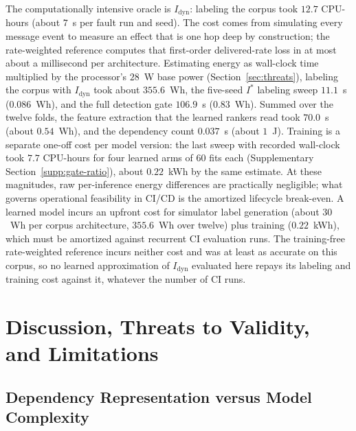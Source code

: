 \documentclass[preprint,3p]{elsarticle}
\begin{document}
The computationally intensive oracle is $I_{\text{dyn}}$: labeling the corpus took $12.7$ CPU-hours (about $7$~s per fault run and seed). The cost comes from simulating every message event to measure an effect that is one hop deep by construction; the rate-weighted reference computes that first-order delivered-rate loss in at most about a millisecond per architecture. Estimating energy as wall-clock time multiplied by the processor's $28$~W base power (Section~\ref{sec:threats}), labeling the corpus with $I_{\text{dyn}}$ took about $355.6$~Wh, the five-seed $I^*$ labeling sweep $11.1$~s ($0.086$~Wh), and the full detection gate $106.9$~s ($0.83$~Wh). Summed over the twelve folds, the feature extraction that the learned rankers read took $70.0$~s (about $0.54$~Wh), and the dependency count $0.037$~s (about $1$~J). Training is a separate one-off cost per model version: the last sweep with recorded wall-clock took $7.7$ CPU-hours for four learned arms of 60 fits each (Supplementary Section~\ref{supp:gate-ratio}), about $0.22$~kWh by the same estimate. At these magnitudes, raw per-inference energy differences are practically negligible; what governs operational feasibility in CI/CD is the amortized lifecycle break-even. A learned model incurs an upfront cost for simulator label generation (about $30$~Wh per corpus architecture, $355.6$~Wh over twelve) plus training ($0.22$~kWh), which must be amortized against recurrent CI evaluation runs. The training-free rate-weighted reference incurs neither cost and was at least as accurate on this corpus, so no learned approximation of $I_{\text{dyn}}$ evaluated here repays its labeling and training cost against it, whatever the number of CI runs.

\section{Discussion, Threats to Validity, and Limitations}
\label{sec:8}

\subsection{Dependency Representation versus Model Complexity}
\label{sec:representation}
\label{sec:restatement}
\end{document}
